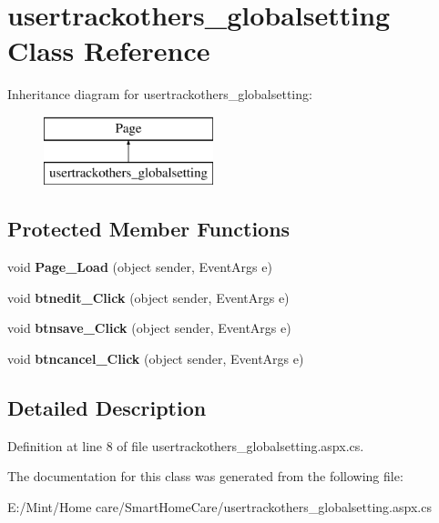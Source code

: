 \hypertarget{classusertrackothers__globalsetting}{\section{usertrackothers\-\_\-globalsetting Class Reference}
\label{classusertrackothers__globalsetting}
}
Inheritance diagram for usertrackothers\-\_\-globalsetting\-:\begin{figure}[H]
\begin{center}
\leavevmode
\includegraphics[height=2.000000cm]{classusertrackothers__globalsetting}
\end{center}
\end{figure}
\subsection*{Protected Member Functions}
\begin{DoxyCompactItemize}
\item 
\hypertarget{classusertrackothers__globalsetting_a1a6851c5bdc32a08cbaed78ec1b27ff8}{void {\bfseries Page\-\_\-\-Load} (object sender, Event\-Args e)}\label{classusertrackothers__globalsetting_a1a6851c5bdc32a08cbaed78ec1b27ff8}

\item 
\hypertarget{classusertrackothers__globalsetting_ab96ec14b514a5e58443da8be3edfeab9}{void {\bfseries btnedit\-\_\-\-Click} (object sender, Event\-Args e)}\label{classusertrackothers__globalsetting_ab96ec14b514a5e58443da8be3edfeab9}

\item 
\hypertarget{classusertrackothers__globalsetting_a98fc139b4aa733ac383f12c0d02184d1}{void {\bfseries btnsave\-\_\-\-Click} (object sender, Event\-Args e)}\label{classusertrackothers__globalsetting_a98fc139b4aa733ac383f12c0d02184d1}

\item 
\hypertarget{classusertrackothers__globalsetting_a6fd97f4c5824cc7e2161f0f75f1faeb4}{void {\bfseries btncancel\-\_\-\-Click} (object sender, Event\-Args e)}\label{classusertrackothers__globalsetting_a6fd97f4c5824cc7e2161f0f75f1faeb4}

\end{DoxyCompactItemize}


\subsection{Detailed Description}


Definition at line 8 of file usertrackothers\-\_\-globalsetting.\-aspx.\-cs.



The documentation for this class was generated from the following file\-:\begin{DoxyCompactItemize}
\item 
E\-:/\-Mint/\-Home care/\-Smart\-Home\-Care/usertrackothers\-\_\-globalsetting.\-aspx.\-cs\end{DoxyCompactItemize}
